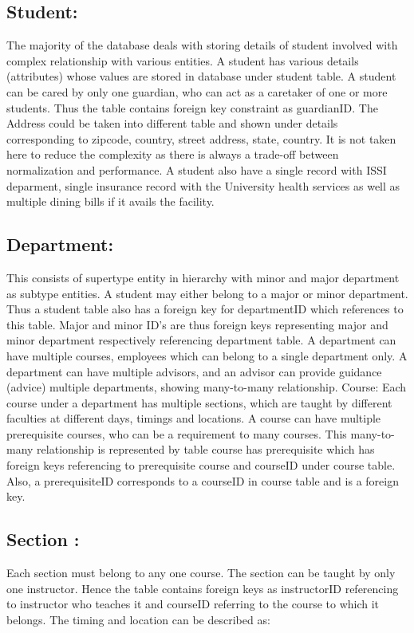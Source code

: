 \documentclass[12pt,letterpaper]{article}
\begin{document}
\subsection{Student:} The majority of the database deals with storing details of student involved with complex relationship with various entities. A student has various details (attributes) whose values are stored in database under student table.  A student can be cared by only one guardian, who can act as a caretaker of one or more students. Thus the table contains foreign key constraint as guardianID. The Address could be taken into different table and shown under details corresponding to zipcode, country, street address, state, country. It is not taken here to reduce the complexity as there is always a trade-off between normalization and performance. A student also have a single record with ISSI deparment, single insurance record with the University health services as well as multiple dining bills if it avails the facility. 
 
\subsection{Department:} This consists of supertype entity in hierarchy with minor and major department as subtype entities. A student may either belong to a major or minor department. Thus a student table also has a foreign key for departmentID which references to this table. Major and minor ID’s are thus foreign keys representing major and minor department respectively referencing department table. A department can have multiple courses, employees which can belong to a single department only. A department can have multiple advisors, and an advisor can provide guidance (advice) multiple departments, showing many-to-many relationship. Course: Each course under a department has multiple sections, which are taught by different faculties at different days, timings and locations. A course can have multiple prerequisite courses, who can be a requirement to many courses. This many-to-many relationship is represented by table course has prerequisite which has foreign keys referencing to prerequisite course and courseID under course table. Also, a prerequisiteID corresponds to a courseID in course table and is a foreign key.
  
\subsection{Section :} Each section must belong to any one course. The section can be taught by only one instructor. Hence the table contains foreign keys as instructorID referencing to instructor who teaches it and courseID referring to the course to which it belongs. The timing and location can be described as:
\end{document}
